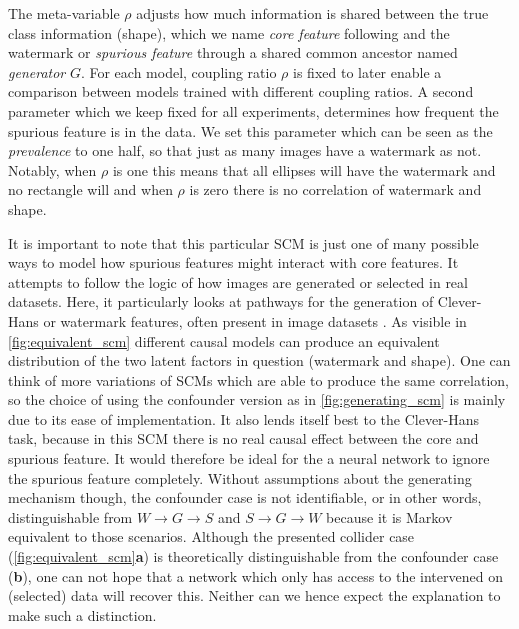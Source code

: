 The meta-variable $\rho$ adjusts how much information is shared between the true class information (shape), which we name \textit{core feature} following \cite{Singla2022} and the watermark or \textit{spurious feature} through a shared common ancestor named \textit{generator} $G$. For each model, coupling ratio $\rho$ is fixed to later enable a comparison between models trained with different coupling ratios. 
A second parameter which we keep fixed for all experiments, determines how frequent the spurious feature is in the data. We set this parameter which can be seen as the \textit{prevalence} to one half, so that just as many images have a watermark as not. Notably, when $\rho$ is one this means that all ellipses will have the watermark and no rectangle will and when $\rho$ is zero there is no correlation of watermark and shape. 

It is important to note that this particular SCM is just one of many possible ways to model how spurious features might interact with core features. It attempts to follow the logic of how images are generated or selected in real datasets. Here, it particularly looks at pathways for the generation of Clever-Hans or watermark features, often present in image datasets \citep{Lapuschkin2019}. As visible in \cref{fig:equivalent_scm} different causal models can produce an equivalent distribution of the two latent factors in question (watermark and shape). One can think of more variations of SCMs which are able to produce the same correlation, so the choice of using the confounder version as in \cref{fig:generating_scm} is mainly due to its ease of implementation. It also lends itself best to the Clever-Hans task, because in this SCM there is no real causal effect between the core and spurious feature. It would therefore be ideal for the a neural network to ignore the spurious feature completely. Without assumptions about the generating mechanism though, the confounder case is not identifiable, or in other words, distinguishable from $W \rightarrow G \rightarrow S$ and $S \rightarrow G \rightarrow W$ because it is Markov equivalent to those scenarios. 
Although the presented collider case (\cref{fig:equivalent_scm}\textbf{a}) is theoretically distinguishable from the confounder case (\textbf{b}), one can not hope that a network which only has access to the intervened on (selected) data will recover this. Neither can we hence expect the explanation to make such a distinction.

